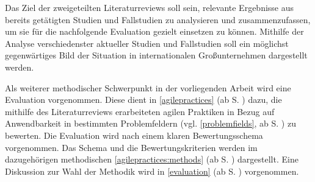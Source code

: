 Das Ziel der zweigeteilten Literaturreviews soll sein, relevante Ergebnisse aus bereits getätigten Studien und Fallstudien zu analysieren und zusammenzufassen, um sie für die nachfolgende Evaluation gezielt einsetzen zu können. Mithilfe der Analyse verschiedenster aktueller Studien und Fallstudien soll ein möglichst gegenwärtiges Bild der Situation in internationalen Großunternehmen dargestellt werden.

Als weiterer methodischer Schwerpunkt in der vorliegenden Arbeit wird eine Evaluation vorgenommen. Diese dient in \ref{agilepractices} (ab S. \pageref{agilepractices}) dazu, die mithilfe des Literaturreviews erarbeiteten agilen Praktiken in Bezug auf Anwendbarkeit in bestimmten Problemfeldern (vgl. \ref{problemfields}, ab S. \pageref{problemfields}) zu bewerten. Die Evaluation wird nach einem klaren Bewertungsschema vorgenommen. Das Schema und die Bewertungskriterien werden im dazugehörigen methodischen \ref{agilepractices:methods} (ab S. \pageref{agilepractices:methods}) dargestellt. Eine Diskussion zur Wahl der Methodik wird in \ref{evaluation} (ab S. \pageref{evaluation}) vorgenommen.
